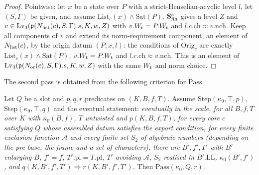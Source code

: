 \begin{proof}
Pointwise: let $x$ be a state over $P$ with a strict-Henselian-acyclic level $l$, let $(S,\Gamma)$ be given,
and assume $\mathrm{List}_c(x)\wedge\mathrm{Sat}(P)$. $\mathbf{S}_{\mathrm{fin}}^{c}$ gives a level $Z$ and
$v\in\mathrm{Lv}_3(\mathfrak{p}(N_{\mathrm{list}}(c),S,\Gamma).s,K,w,Z)$ with $v.W_{\mathrm{t}}=P.W_{\mathrm{t}}$ and
$l.c.\mathrm{ch}\approx v.\mathrm{nch}$. Keep all components of $v$ and extend its norm-requirement
component, an element of $N_{\mathrm{list}}(c)$, by the origin datum $(P,x,l)$: the conditions of
$\mathrm{Orig}_c$ are exactly $\mathrm{List}_c(x)\wedge\mathrm{Sat}(P)$, $v.W_{\mathrm{t}}=P.W_{\mathrm{t}}$ and
$l.c.\mathrm{ch}\approx v.\mathrm{nch}$. This is an element of
$\mathrm{Lv}_3(\mathfrak{p}(N_{\mathrm{or}}(c),S,\Gamma).s,K,w,Z)$ with the same $W_{\mathrm{t}}$ and norm choice.
\end{proof}

The second pass is obtained from the following criterion for $\mathrm{Pass}$.

\begin{lemma}\label{pf:baselat2:passof}
Let $Q$ be a slot and $p,q,r$ predicates on $(K,B,f,T)$. Assume $\mathrm{Step}(\kappa_0,\top,p)$,
$\mathrm{Step}(\kappa_0,\top,q)$ and the eventual statement: \emph{eventually in the scale, for all
$B,f,T$ over $K$ with $\kappa_0(B,f)$, $T$ untwisted and $p(K,B,f,T)$, for every core $c$ satisfying
$Q$ whose assembled datum satisfies the export condition, for every finite exclusion function $\mathcal A$ and
every finite set $S_2$ of algebraic numbers (depending on the pre-base, the frame and a set of
characters), there are $B',f',T'$ with $B'$ enlarging $B$, $f'=f$, $T'.\mathrm{pl}=T.\mathrm{pl}$, $T'$
avoiding $\mathcal A$, $S_2$ realised in $B'.\mathrm{LL}$, $\kappa_0(B',f')$, and
$q(K,B',f',T')\Rightarrow r(K,B',f',T')$.} Then $\mathrm{Pass}(\kappa_0,Q,r)$.
\end{lemma}

